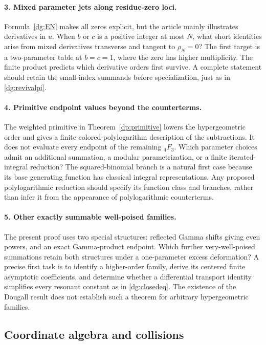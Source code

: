 \paragraph{3. Mixed parameter jets along residue-zero loci.}
Formula~\eqref{dg:EN} makes all zeros explicit, but the article mainly
illustrates derivatives in $u$. When $b$ or $c$ is a positive integer
at most $N$, what short identities arise from mixed derivatives
transverse and tangent to $\rho_N=0$? The first target is a
two-parameter table at $b=c=1$, where the zero has higher multiplicity.
The finite product predicts which derivative orders first survive.
A complete statement should retain the small-index summands before
specialization, just as in \eqref{dg:revivalpi}.

\paragraph{4. Primitive endpoint values beyond the counterterms.}
The weighted primitive in Theorem~\ref{dp:primitive} lowers the
hypergeometric order and gives a finite colored-polylogarithm
description of the subtractions. It does not evaluate every endpoint
of the remaining \({}_4F_3\). Which parameter choices admit an
additional summation, a modular parametrization, or a finite
iterated-integral reduction? The squared-binomial branch is a
natural first case because its base generating function has
classical integral representations. Any proposed polylogarithmic
reduction should specify its function class and branches, rather
than infer it from the appearance of polylogarithmic counterterms.

\paragraph{5. Other exactly summable well-poised families.}
The present proof uses two special structures: reflected Gamma
shifts giving even powers, and an exact Gamma-product endpoint.
Which further very-well-poised summations retain both structures
under a one-parameter excess deformation? A precise first task is
to identify a higher-order family, derive its centered finite
asymptotic coefficients, and determine whether a differential
transport identity simplifies every resonant constant as in
\eqref{dg:closedeq}. The existence of the Dougall result does not
establish such a theorem for arbitrary hypergeometric families.

\subsection{Coordinate algebra and collisions}

